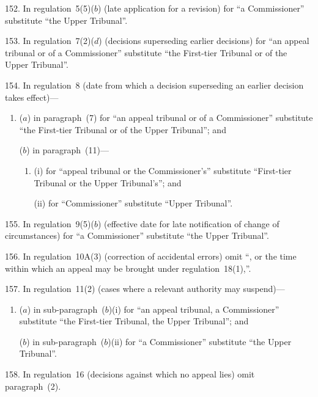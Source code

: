 \documentclass[12pt,a4paper]{article}
\begin{document}
\medskip

152.  In regulation~5(5)($b$)  (late application for a revision) for “a Commissioner” substitute “the Upper Tribunal”.

\medskip

153.  In regulation~7(2)($d$)  (decisions superseding earlier decisions) for “an appeal tribunal or of a Commissioner” substitute “the First-tier Tribunal or of the Upper Tribunal”.

\medskip

154.  In regulation~8 (date from which a decision superseding an earlier decision takes effect)—
\begin{enumerate}\item[]
($a$) in paragraph~(7) for “an appeal tribunal or of a Commissioner” substitute “the First-tier Tribunal or of the Upper Tribunal”; and

($b$) in paragraph~(11)—
\begin{enumerate}\item[]
(i) for “appeal tribunal or the Commissioner’s” substitute “First-tier Tribunal or the Upper Tribunal’s”; and

(ii) for “Commissioner” substitute “Upper Tribunal”.
\end{enumerate}
\end{enumerate}

\medskip

155.  In regulation~9(5)($b$)  (effective date for late notification of change of circumstances) for “a Commissioner” substitute “the Upper Tribunal”.

\medskip

156.  In regulation~10A(3) (correction of accidental errors) omit “, or the time within which an appeal may be brought under regulation~18(1),”.

\medskip

157.  In regulation~11(2) (cases where a relevant authority may suspend)—
\begin{enumerate}\item[]
($a$) in sub-paragraph~($b$)(i)  for “an appeal tribunal, a Commissioner” substitute “the First-tier Tribunal, the Upper Tribunal”; and

($b$) in sub-paragraph~($b$)(ii)  for “a Commissioner” substitute “the Upper Tribunal”.
\end{enumerate}

\medskip

158.  In regulation~16 (decisions against which no appeal lies) omit paragraph~(2).
\end{document}
